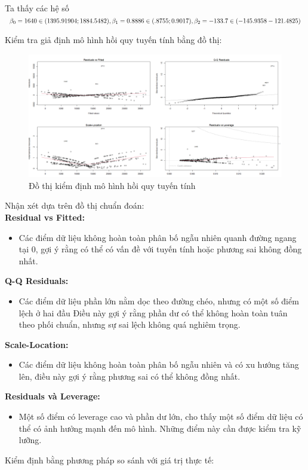 Ta thấy các hệ số $\beta_0= 1640\in(1395.91904; 1884.5482), \beta_1= 0.8886\in(.8755;0.9017),\\ \beta_2= -133.7\in(-145.9358 -121.4825)$

Kiểm tra giả định mô hình hồi quy tuyến tính bằng đồ thị:

\begin{figure}[h]
  \centering
  \includegraphics[width=0.7\linewidth]{graphics/5.5.6.png}
  \caption{Đồ thị kiểm định mô hình hồi quy  tuyến tính }
\end{figure}

Nhận xét dựa trên đồ thị chuẩn đoán:\\
\textbf{Residual vs Fitted:}
\begin{itemize}
 \item Các điểm dữ liệu không hoàn toàn phân bố ngẫu nhiên quanh đường ngang tại 0, gợi ý rằng có thể có vấn đề với tuyến tính hoặc phương sai không đồng nhất. 
\end{itemize}
 \textbf{Q-Q Residuals:}
 \begin{itemize}
\item Các điểm dữ liệu phần lớn nằm dọc theo đường chéo, nhưng có một số điểm lệch ở hai đầu Điều này gợi ý rằng phần dư có thể không hoàn toàn tuân theo phối chuẩn, nhưng sự sai lệch không quá nghiêm trọng.
 \end{itemize}
\textbf{Scale-Location:}
\begin{itemize}
\item Các điểm dữ liệu không hoàn toàn phân bố ngẫu nhiên và có xu hướng tăng lên, điều này gợi ý rằng phương sai có thể không đồng nhất.
\end{itemize}
\textbf{Residuals và Leverage:}
\begin{itemize}
\item Một số điểm có leverage cao và phần dư lớn, cho thấy một số điểm dữ liệu  có thể có ảnh hưởng mạnh đến mô hình. Những điểm này cần được kiểm tra kỹ lưỡng.
\end{itemize}

Kiểm định bằng phương pháp so sánh với giá trị thực tế:

